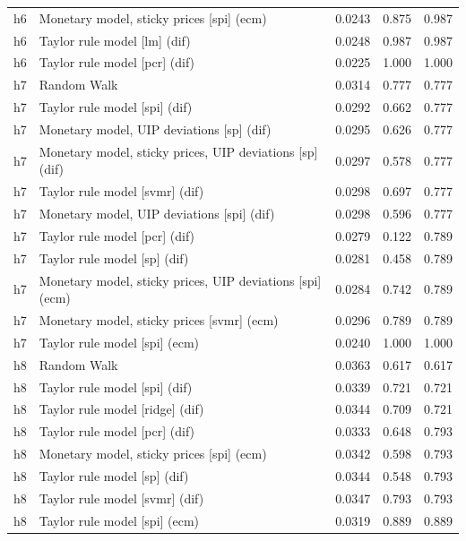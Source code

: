 \begin{ThreePartTable}
\begin{longtable}[t]{cp{5.5cm}ccc}
h6 & \raggedright Monetary model, sticky prices [spi] (ecm) & 0.0243 & 0.875 & 0.987\\
h6 & \raggedright Taylor rule model [lm] (dif) & 0.0248 & 0.987 & 0.987\\
h6 & \raggedright Taylor rule model [pcr] (dif) & 0.0225 & 1.000 & 1.000\\
\addlinespace
h7 & \raggedright Random Walk & 0.0314 & 0.777 & 0.777\\
h7 & \raggedright Taylor rule model [spi] (dif) & 0.0292 & 0.662 & 0.777\\
h7 & \raggedright Monetary model, UIP deviations [sp] (dif) & 0.0295 & 0.626 & 0.777\\
h7 & \raggedright Monetary model, sticky prices, UIP deviations [sp] (dif) & 0.0297 & 0.578 & 0.777\\
h7 & \raggedright Taylor rule model [svmr] (dif) & 0.0298 & 0.697 & 0.777\\
h7 & \raggedright Monetary model, UIP deviations [spi] (dif) & 0.0298 & 0.596 & 0.777\\
h7 & \raggedright Taylor rule model [pcr] (dif) & 0.0279 & 0.122 & 0.789\\
h7 & \raggedright Taylor rule model [sp] (dif) & 0.0281 & 0.458 & 0.789\\
h7 & \raggedright Monetary model, sticky prices, UIP deviations [spi] (ecm) & 0.0284 & 0.742 & 0.789\\
h7 & \raggedright Monetary model, sticky prices [svmr] (ecm) & 0.0296 & 0.789 & 0.789\\
h7 & \raggedright Taylor rule model [spi] (ecm) & 0.0240 & 1.000 & 1.000\\
\addlinespace
h8 & \raggedright Random Walk & 0.0363 & 0.617 & 0.617\\
h8 & \raggedright Taylor rule model [spi] (dif) & 0.0339 & 0.721 & 0.721\\
h8 & \raggedright Taylor rule model [ridge] (dif) & 0.0344 & 0.709 & 0.721\\
h8 & \raggedright Taylor rule model [pcr] (dif) & 0.0333 & 0.648 & 0.793\\
h8 & \raggedright Monetary model, sticky prices [spi] (ecm) & 0.0342 & 0.598 & 0.793\\
h8 & \raggedright Taylor rule model [sp] (dif) & 0.0344 & 0.548 & 0.793\\
h8 & \raggedright Taylor rule model [svmr] (dif) & 0.0347 & 0.793 & 0.793\\
h8 & \raggedright Taylor rule model [spi] (ecm) & 0.0319 & 0.889 & 0.889\\

\end{longtable}
\end{ThreePartTable}
